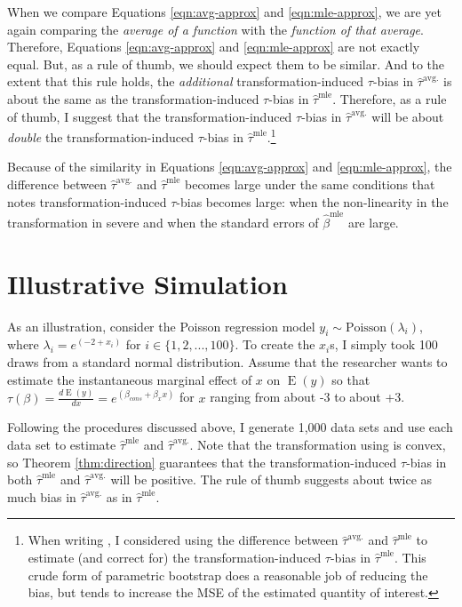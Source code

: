 \documentclass[10pt]{article}
\DeclareMathOperator*{\E}{\text{E}}
\begin{document}
When we compare Equations \ref{eqn:avg-approx} and \ref{eqn:mle-approx}, we are yet again comparing the \textit{average of a function} with the \textit{function of that average}. 
Therefore, Equations \ref{eqn:avg-approx} and \ref{eqn:mle-approx} are not exactly equal. 
But, as a rule of thumb, we should expect them to be similar. And to the extent that this rule holds, the \emph{additional} transformation-induced $\tau$-bias in $\hat{\tau}^\text{avg.}$ is about the same as the transformation-induced $\tau$-bias in $\hat{\tau}^\text{mle}$. 
Therefore, as a rule of thumb, I suggest that the transformation-induced $\tau$-bias in $\hat{\tau}^\text{avg.}$ will be about \emph{double} the transformation-induced $\tau$-bias in $\hat{\tau}^\text{mle}$.\footnote{When writing \cite{Rainey2017}, I considered using the difference between $\hat{\tau}^\text{avg.}$ and $\hat{\tau}^\text{mle}$ to estimate (and correct for) the transformation-induced $\tau$-bias in $\hat{\tau}^\text{mle}$. This crude form of parametric bootstrap does a reasonable job of reducing the bias, but tends to increase the MSE of the estimated quantity of interest.}

Because of the similarity in Equations \ref{eqn:avg-approx} and \ref{eqn:mle-approx}, the difference between $\hat{\tau}^\text{avg.}$ and $\hat{\tau}^\text{mle}$ becomes large under the same conditions that \cite{Rainey2017} notes transformation-induced $\tau$-bias becomes large: when the non-linearity in the transformation in severe and when the standard errors of $\hat{\beta}^\text{mle}$ are large.

\section*{Illustrative Simulation}

As an illustration, consider the Poisson regression model $y_i \sim \text{Poisson}(\lambda_i)$, where $\lambda_i = e^{(-2 + x_i)}$ for $i \in \{1, 2, ..., 100\}$. 
To create the $x_i$s, I simply took 100 draws from a standard normal distribution. 
Assume that the researcher wants to estimate the instantaneous marginal effect of $x$ on $\E(y)$ so that $\tau(\beta) = \frac{d \E (y)}{dx} = e^{(\beta_{cons} + \beta_x x)}$ for $x$ ranging from about -3 to about +3.

Following the procedures discussed above, I generate 1,000 data sets and use each data set to estimate $\hat{\tau}^\text{mle}$ and $\hat{\tau}^\text{avg.}$. 
Note that the transformation using is convex, so Theorem \ref{thm:direction} guarantees that the transformation-induced $\tau$-bias in both $\hat{\tau}^\text{mle}$ and $\hat{\tau}^\text{avg.}$ will be positive. The rule of thumb suggests about twice as much bias in $\hat{\tau}^\text{avg.}$ as in $\hat{\tau}^\text{mle}$. 
\end{document}
